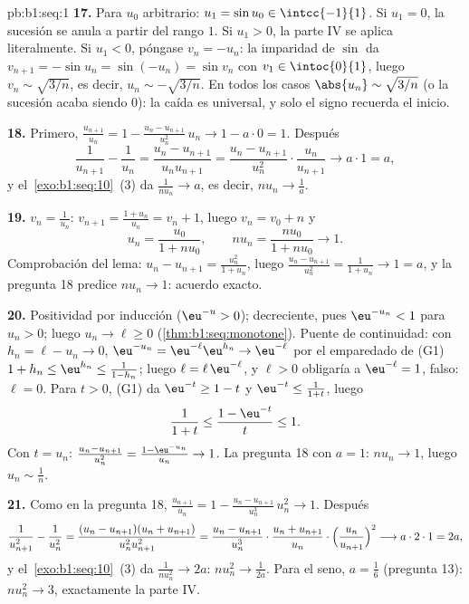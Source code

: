 \begin{solution}{pb:b1:seq:1}
\textbf{17.} Para $u_0$ arbitrario: $u_1 = \sin u_0 \in
\intcc{-1}{1}$. Si $u_1 = 0$, la sucesión se anula a partir del
rango $1$. Si $u_1 > 0$, la parte IV se aplica literalmente. Si
$u_1 < 0$, póngase $v_n = -u_n$: la imparidad de $\sin$ da
$v_{n+1} = -\sin u_n = \sin(-u_n) = \sin v_n$ con
$v_1 \in \intoc{0}{1}$, luego $v_n \sim \sqrt{3/n}$, es decir,
$u_n \sim -\sqrt{3/n}$. En todos los casos $\abs{u_n} \sim
\sqrt{3/n}$ (o la sucesión acaba siendo $0$): la caída es universal, y
solo el signo recuerda el inicio.

\textbf{18.} Primero, $\frac{u_{n+1}}{u_n} = 1 - \frac{u_n -
u_{n+1}}{u_n^2}\,u_n \to 1 - a \cdot 0 = 1$. Después
\[
\frac{1}{u_{n+1}} - \frac{1}{u_n}
= \frac{u_n - u_{n+1}}{u_n u_{n+1}}
= \frac{u_n - u_{n+1}}{u_n^2}\cdot\frac{u_n}{u_{n+1}}
\longrightarrow a \cdot 1 = a ,
\]
y el~\cref{exo:b1:seq:10}~(3) da $\frac{1}{n u_n} \to a$, es decir,
$n u_n \to \frac1a$.

\textbf{19.} $v_n = \frac{1}{u_n}$: $v_{n+1} = \frac{1 + u_n}{u_n} =
v_n + 1$, luego $v_n = v_0 + n$ y
\[
u_n = \frac{u_0}{1 + n u_0} , \qquad
n u_n = \frac{n u_0}{1 + n u_0} \longrightarrow 1 .
\]
Comprobación del lema: $u_n - u_{n+1} = \frac{u_n^2}{1 + u_n}$, luego
$\frac{u_n - u_{n+1}}{u_n^2} = \frac{1}{1 + u_n} \to 1 = a$, y la
pregunta 18 predice $n u_n \to 1$: acuerdo exacto.

\textbf{20.} Positividad por inducción ($\eu^{-u} > 0$); decreciente,
pues $\eu^{-u_n} < 1$ para $u_n > 0$; luego $u_n \to \ell \geq 0$
(\cref{thm:b1:seq:monotone}). Puente de continuidad: con
$h_n = \ell - u_n \to 0$, $\eu^{-u_n} = \eu^{-\ell} \eu^{h_n} \to
\eu^{-\ell}$ por el emparedado de (G1)
$1 + h_n \leq \eu^{h_n} \leq \frac{1}{1 - h_n}$; luego
$\ell = \ell\, \eu^{-\ell}$, y $\ell > 0$ obligaría a
$\eu^{-\ell} = 1$, falso: $\ell = 0$. Para $t > 0$, (G1) da
$\eu^{-t} \geq 1 - t$ y $\eu^{-t} \leq \frac{1}{1 + t}$, luego
\[
\frac{1}{1 + t} \leq \frac{1 - \eu^{-t}}{t} \leq 1 .
\]
Con $t = u_n$: $\frac{u_n - u_{n+1}}{u_n^2} = \frac{1 -
\eu^{-u_n}}{u_n} \to 1$. La pregunta 18 con $a = 1$: $n u_n \to 1$,
luego $u_n \sim \frac1n$.

\textbf{21.} Como en la pregunta 18, $\frac{u_{n+1}}{u_n} = 1 -
\frac{u_n - u_{n+1}}{u_n^3}\,u_n^2 \to 1$. Después
\[
\frac{1}{u_{n+1}^2} - \frac{1}{u_n^2}
= \frac{(u_n - u_{n+1})(u_n + u_{n+1})}{u_n^2 u_{n+1}^2}
= \frac{u_n - u_{n+1}}{u_n^3}\cdot
\frac{u_n + u_{n+1}}{u_n}\cdot
\Bigl(\frac{u_n}{u_{n+1}}\Bigr)^2
\longrightarrow a \cdot 2 \cdot 1 = 2a ,
\]
y el~\cref{exo:b1:seq:10}~(3) da $\frac{1}{n u_n^2} \to 2a$:
$n u_n^2 \to \frac{1}{2a}$. Para el seno, $a = \frac16$
(pregunta 13): $n u_n^2 \to 3$, exactamente la parte IV.


\end{solution}
